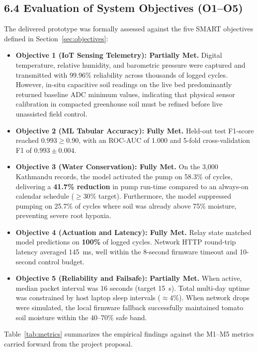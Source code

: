 \documentclass[12pt, a4paper]{article}
\begin{document}
\subsection{6.4 Evaluation of System Objectives (O1--O5)}
\label{sec:obj-eval}

The delivered prototype was formally assessed against the five SMART objectives defined in Section~\ref{sec:objectives}:

\begin{itemize}[leftmargin=1.4cm, itemsep=4pt]
    \item \textbf{Objective 1 (IoT Sensing Telemetry): Partially Met.} Digital temperature, relative humidity, and barometric pressure were captured and transmitted with 99.96\% reliability across thousands of logged cycles. However, in-situ capacitive soil readings on the live bed predominantly returned baseline ADC minimum values, indicating that physical sensor calibration in compacted greenhouse soil must be refined before live unassisted field control.
    \item \textbf{Objective 2 (ML Tabular Accuracy): Fully Met.} Held-out test F1-score reached $0.993 \ge 0.90$, with an ROC-AUC of 1.000 and 5-fold cross-validation F1 of $0.993 \pm 0.004$.
    \item \textbf{Objective 3 (Water Conservation): Fully Met.} On the 3{,}000 Kathmandu records, the model activated the pump on 58.3\% of cycles, delivering a \textbf{41.7\% reduction} in pump run-time compared to an always-on calendar schedule ($\ge 30\%$ target). Furthermore, the model suppressed pumping on 25.7\% of cycles where soil was already above 75\% moisture, preventing severe root hypoxia.
    \item \textbf{Objective 4 (Actuation and Latency): Fully Met.} Relay state matched model predictions on \textbf{100\%} of logged cycles. Network HTTP round-trip latency averaged 145~ms, well within the 8-second firmware timeout and 10-second control budget.
    \item \textbf{Objective 5 (Reliability and Failsafe): Partially Met.} When active, median packet interval was 16 seconds (target 15~s). Total multi-day uptime was constrained by host laptop sleep intervals ($\approx 4\%$). When network drops were simulated, the local firmware fallback successfully maintained tomato soil moisture within the 40--70\% safe band.
\end{itemize}

Table~\ref{tab:metrics} summarizes the empirical findings against the M1--M5 metrics carried forward from the project proposal.
\end{document}
